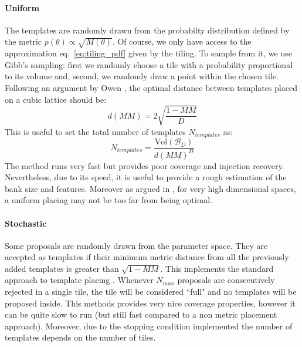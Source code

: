 \documentclass[twocolumn,showpacs,preprintnumbers,nofootinbib,prd,
superscriptaddress,10pt]{revtex4-2}
\newcommand{\stefano}[1]{{\textcolor{blue}{\texttt{SS: #1}} }}
\begin{document}
\paragraph{Uniform}\label{par:uniform}
The templates are randomly drawn from the probabilty distribution defined by the metric $p(\theta) \propto \sqrt{M(\theta)}$.
Of course, we only have access to the approximation eq.~\eqref{eq:tiling_pdf} given by the tiling. To sample from it, we use Gibb's sampling: first we randomly choose a tile with a probability proportional to its volume and, second, we randomly draw a point within the chosen tile.
\\
Following an argument by Owen \cite{owen_metric}, the optimal distance between templates placed on a cubic lattice should be:
\begin{equation}
	d(MM) = 2 \sqrt{\frac{1-MM}{D}}
\end{equation}
This is useful to set the total number of templates $N_{templates}$ as:
\begin{equation} \label{eq:N_templates}
	N_{templates} = \frac{\text{Vol}(\mathcal{B}_D)}{d(MM)^D}
\end{equation}
The method runs very fast but provides poor coverage and injection recovery. Nevertheless, due to its speed, it is useful to provide a rough estimation of the bank size and features.
Moreover as argued in \cite{Allen_performance_templates}, for very high dimensional spaces, a uniform placing may not be too far from being optimal.

\paragraph{Stochastic}\label{par:stochastic}
Some proposals are randomly drawn from the parameter space. They are accepted as templates if their minimum metric distance from all the previously added templates is greater than  $\sqrt{1-MM}$.
This implements the standard approach to template placing \cite{}.
Whenever $N_{max}$ proposals are consecutively rejected in a single tile, the tile will be considered ``full" and no templates will be proposed inside.
This methods provides very nice coverage properties, however it can be quite slow to run (but still fast compared to a non metric placement approach). Moreover, due to the stopping condition implemented the number of templates depends on the number of tiles.
\end{document}
